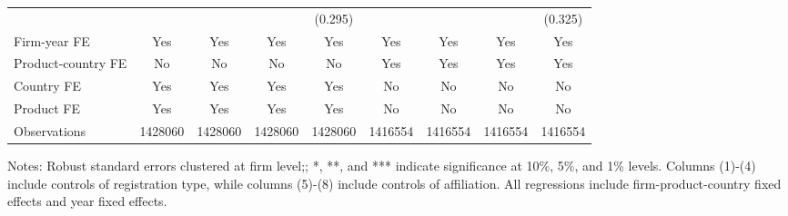 \documentclass[12pt]{article}
\begin{document}
\begin{table}
\begin{threeparttable}
\begin{tabular}{lcccccccc}
			&       &       &       & (0.295) &&&& (0.325)\\
			Firm-year FE  &  Yes   & Yes   & Yes & Yes & Yes & Yes & Yes & Yes\\
			Product-country FE & No & No & No & No & Yes & Yes & Yes & Yes\\
			Country FE &  Yes   & Yes   & Yes   & Yes & No & No & No & No\\
			Product FE &  Yes   & Yes   & Yes   & Yes & No & No & No & No\\
			Observations & 1428060 & 1428060 & 1428060 & 1428060 & 1416554 & 1416554 & 1416554 & 1416554\\
			\bottomrule
		\end{tabular}
		\begin{tablenotes}
			\footnotesize
			\item[Notes:] Robust standard errors clustered at firm level;; *, **, and *** indicate significance at 10\%, 5\%, and 1\% levels. Columns (1)-(4) include controls of registration type, while columns (5)-(8) include controls of affiliation. All regressions include firm-product-country fixed effects and year fixed effects.
		\end{tablenotes}
	\end{threeparttable}
	\label{tab.robust.fe}
\end{table}
\end{document}
